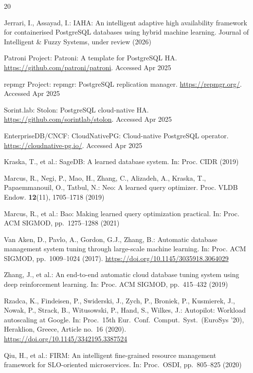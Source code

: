 \documentclass[iicol,pdflatex,sn-mathphys-num]{sn-jnl}
\theoremstyle{thmstyleone}
\theoremstyle{thmstylethree}
\begin{document}
\begin{thebibliography}{20}

Jerrari, I., Assayad, I.: IAHA: An intelligent adaptive high
availability framework for containerised PostgreSQL databases using
hybrid machine learning. Journal of Intelligent \& Fuzzy Systems,
under review (2026)

Patroni Project: Patroni: A template for PostgreSQL HA.
\url{https://github.com/patroni/patroni}. Accessed Apr 2025

repmgr Project: repmgr: PostgreSQL replication manager.
\url{https://repmgr.org/}. Accessed Apr 2025

Sorint.lab: Stolon: PostgreSQL cloud-native HA.
\url{https://github.com/sorintlab/stolon}. Accessed Apr 2025

EnterpriseDB/CNCF: CloudNativePG: Cloud-native PostgreSQL operator.
\url{https://cloudnative-pg.io/}. Accessed Apr 2025

Kraska, T., et al.: SageDB: A learned database system. In: Proc. CIDR
(2019)

Marcus, R., Negi, P., Mao, H., Zhang, C., Alizadeh, A., Kraska, T.,
Papaemmanouil, O., Tatbul, N.: Neo: A learned query optimizer. Proc.
VLDB Endow. \textbf{12}(11), 1705--1718 (2019)

Marcus, R., et al.: Bao: Making learned query optimization practical.
In: Proc. ACM SIGMOD, pp.\ 1275--1288 (2021)

Van Aken, D., Pavlo, A., Gordon, G.J., Zhang, B.: Automatic database
management system tuning through large-scale machine learning. In:
Proc. ACM SIGMOD, pp.\ 1009--1024 (2017).
\url{https://doi.org/10.1145/3035918.3064029}

Zhang, J., et al.: An end-to-end automatic cloud database tuning
system using deep reinforcement learning. In: Proc. ACM SIGMOD, pp.\
415--432 (2019)

Rzadca, K., Findeisen, P., Swiderski, J., Zych, P., Broniek, P.,
Kusmierek, J., Nowak, P., Strack, B., Witusowski, P., Hand, S.,
Wilkes, J.: Autopilot: Workload autoscaling at Google. In: Proc.\ 15th
Eur.\ Conf.\ Comput.\ Syst.\ (EuroSys '20), Heraklion, Greece, Article
no.\ 16 (2020). \url{https://doi.org/10.1145/3342195.3387524}

Qiu, H., et al.: FIRM: An intelligent fine-grained resource
management framework for SLO-oriented microservices. In: Proc.\ OSDI,
pp.\ 805--825 (2020)


\end{thebibliography}
\end{document}
